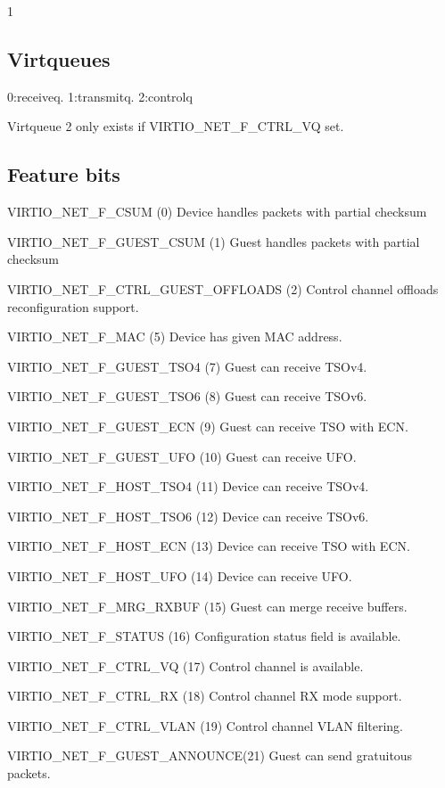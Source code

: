  1

\subsection{Virtqueues}\label{sec:Device Types / Network Device / Virtqueues}

 0:receiveq. 1:transmitq. 2:controlq

 Virtqueue 2 only exists if VIRTIO_NET_F_CTRL_VQ set.

\subsection{Feature bits}\label{sec:Device Types / Network Device / Feature bits}

  VIRTIO_NET_F_CSUM (0) Device handles packets with partial checksum

  VIRTIO_NET_F_GUEST_CSUM (1) Guest handles packets with partial checksum

  VIRTIO_NET_F_CTRL_GUEST_OFFLOADS (2) Control channel offloads
        reconfiguration support.

  VIRTIO_NET_F_MAC (5) Device has given MAC address.

  VIRTIO_NET_F_GUEST_TSO4 (7) Guest can receive TSOv4.

  VIRTIO_NET_F_GUEST_TSO6 (8) Guest can receive TSOv6.

  VIRTIO_NET_F_GUEST_ECN (9) Guest can receive TSO with ECN.

  VIRTIO_NET_F_GUEST_UFO (10) Guest can receive UFO.

  VIRTIO_NET_F_HOST_TSO4 (11) Device can receive TSOv4.

  VIRTIO_NET_F_HOST_TSO6 (12) Device can receive TSOv6.

  VIRTIO_NET_F_HOST_ECN (13) Device can receive TSO with ECN.

  VIRTIO_NET_F_HOST_UFO (14) Device can receive UFO.

  VIRTIO_NET_F_MRG_RXBUF (15) Guest can merge receive buffers.

  VIRTIO_NET_F_STATUS (16) Configuration status field is
    available.

  VIRTIO_NET_F_CTRL_VQ (17) Control channel is available.

  VIRTIO_NET_F_CTRL_RX (18) Control channel RX mode support.

  VIRTIO_NET_F_CTRL_VLAN (19) Control channel VLAN filtering.

  VIRTIO_NET_F_GUEST_ANNOUNCE(21) Guest can send gratuitous
    packets.

